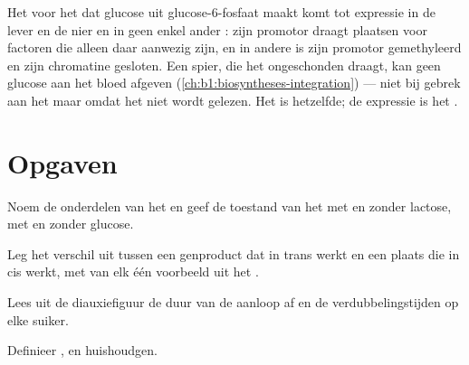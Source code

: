 \begin{example}\label{ex:b1:expression-control:twoorgans}
Het  voor het  dat glucose uit glucose-6-fosfaat maakt komt tot expressie in
de lever en de nier en in geen enkel ander : zijn promotor draagt plaatsen
voor factoren die alleen daar aanwezig zijn, en in andere  is zijn promotor
gemethyleerd en zijn chromatine gesloten. Een spier, die het  ongeschonden
draagt, kan geen glucose aan het bloed afgeven
(\cref{ch:b1:biosyntheses-integration}) --- niet bij gebrek aan het  maar omdat
het  niet wordt gelezen. Het  is hetzelfde; de expressie is het .
\end{example}

\section{Opgaven}

\begin{exercise}[$\star$]\label{exo:b1:expression-control:1}
Noem de onderdelen van het  en geef de toestand van het  met en
zonder lactose, met en zonder glucose.
\end{exercise}

\begin{exercise}[$\star$]\label{exo:b1:expression-control:2}
Leg het verschil uit tussen een genproduct dat in trans werkt en een plaats die in
cis werkt, met van elk één voorbeeld uit het .
\end{exercise}

\begin{exercise}[$\star$]\label{exo:b1:expression-control:3}
Lees uit de diauxiefiguur de duur van de aanloop af en de verdubbelingstijden op
elke suiker.
\end{exercise}

\begin{exercise}[$\star$]\label{exo:b1:expression-control:4}
Definieer ,  en huishoudgen.
\end{exercise}

